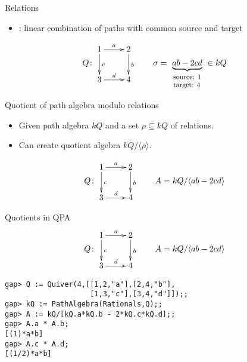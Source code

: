 \begin{frame}{Relations}
\begin{itemize}
\item {}: linear combination of paths with common source and target
\end{itemize}
\[
Q \colon
\vcenter{\xymatrix{
1\ar[r]^a\ar[d]^c & 2\ar[d]^b\\
3\ar[r]^d & 4
}}
\qquad
\sigma = \underbrace{ab - 2cd}_{
\footnotesize
\begin{array}{l}
\text{source: $1$}\\
\text{target: $4$}
\end{array}
} \in kQ
\]
\end{frame}

\begin{frame}{Quotient of path algebra modulo relations}
\begin{itemize}
\item Given path algebra $kQ$ and a set $\rho \subseteq kQ$ of relations.
\item Can create quotient algebra $kQ / \langle \rho \rangle$.
\end{itemize}
\[
Q \colon
\vcenter{\xymatrix{
1\ar[r]^a\ar[d]^c & 2\ar[d]^b\\
3\ar[r]^d & 4
}}
\qquad
A = kQ/\langle ab - 2cd \rangle
\]
\end{frame}

\begin{frame}[fragile]{Quotients in QPA}
\[
Q \colon
\vcenter{\xymatrix{
1\ar[r]^a\ar[d]^c & 2\ar[d]^b\\
3\ar[r]^d & 4
}}
\qquad
A = kQ/\langle ab - 2cd \rangle
\]
\begin{verbatim}
gap> Q := Quiver(4,[[1,2,"a"],[2,4,"b"],
                    [1,3,"c"],[3,4,"d"]]);;
gap> kQ := PathAlgebra(Rationals,Q);;
gap> A := kQ/[kQ.a*kQ.b - 2*kQ.c*kQ.d];;
gap> A.a * A.b;
[(1)*a*b]
gap> A.c * A.d;
[(1/2)*a*b]
\end{verbatim}
\end{frame}


